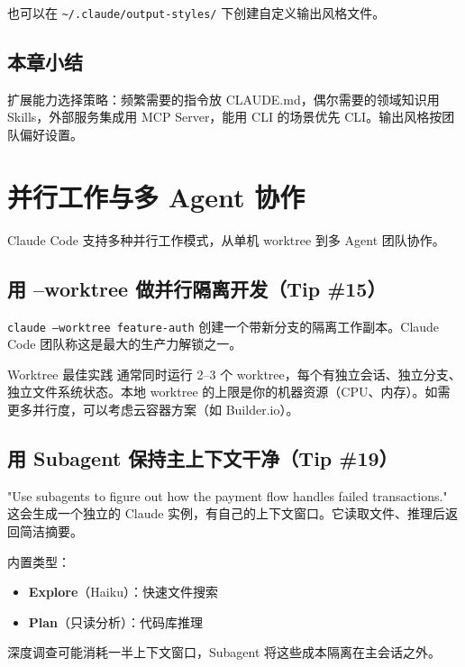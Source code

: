 \documentclass[a4paper]{article}
\begin{document}
也可以在 \texttt{\textasciitilde/.claude/output-styles/} 下创建自定义输出风格文件。

\subsection{本章小结}

扩展能力选择策略：频繁需要的指令放 CLAUDE.md，偶尔需要的领域知识用 Skills，外部服务集成用 MCP Server，能用 CLI 的场景优先 CLI。输出风格按团队偏好设置。

\section{并行工作与多 Agent 协作}

Claude Code 支持多种并行工作模式，从单机 worktree 到多 Agent 团队协作。

\subsection{用 --worktree 做并行隔离开发（Tip \#15）}

\texttt{claude --worktree feature-auth} 创建一个带新分支的隔离工作副本。Claude Code 团队称这是最大的生产力解锁之一。

\begin{importantbox}{Worktree 最佳实践}
通常同时运行 2--3 个 worktree，每个有独立会话、独立分支、独立文件系统状态。本地 worktree 的上限是你的机器资源（CPU、内存）。如需更多并行度，可以考虑云容器方案（如 Builder.io）。
\end{importantbox}

\subsection{用 Subagent 保持主上下文干净（Tip \#19）}

"Use subagents to figure out how the payment flow handles failed transactions." 这会生成一个独立的 Claude 实例，有自己的上下文窗口。它读取文件、推理后返回简洁摘要。

内置类型：
\begin{itemize}
  \item \textbf{Explore}（Haiku）：快速文件搜索
  \item \textbf{Plan}（只读分析）：代码库推理
\end{itemize}

深度调查可能消耗一半上下文窗口，Subagent 将这些成本隔离在主会话之外。
\end{document}
